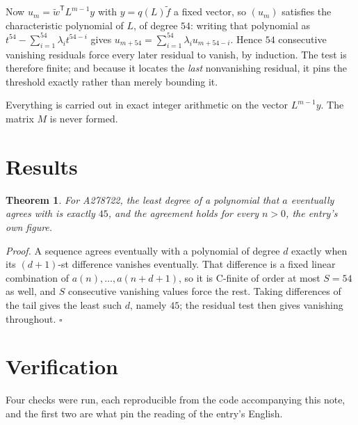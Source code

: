 \documentclass[11pt]{article}
\newtheorem{theorem}{Theorem}
\theoremstyle{definition}
\begin{document}
Now $u_m = \tilde w^{\mathsf T} L^{m-1} y$ with $y = q(L)\tilde f$ a fixed vector, so $(u_m)$ satisfies the characteristic polynomial of $L$, of degree $54$: writing that polynomial as $t^{54} - \sum_{i=1}^{54} \lambda_i t^{54-i}$ gives $u_{m+54} = \sum_{i=1}^{54} \lambda_i u_{m+54-i}$. Hence $54$ consecutive vanishing residuals force every later residual to vanish, by induction. The test is therefore finite; and because it locates the {\itshape last} nonvanishing residual, it pins the threshold exactly rather than merely bounding it.

Everything is carried out in exact integer arithmetic on the vector $L^{m-1}y$. The matrix $M$ is never formed.

\section{Results}

\begin{theorem} For A278722, the least degree of a polynomial that $a$ eventually agrees with is exactly $45$, and the agreement holds for every $n > 0$, the entry's own figure.\end{theorem}

{\itshape Proof.} A sequence agrees eventually with a polynomial of degree $d$ exactly when its $(d+1)$-st difference vanishes eventually. That difference is a fixed linear combination of $a(n),\dots,a(n+d+1)$, so it is C-finite of order at most $S = 54$ as well, and $S$ consecutive vanishing values force the rest. Taking differences of the tail gives the least such $d$, namely $45$; the residual test then gives vanishing throughout. $\square$

\section{Verification}

Four checks were run, each reproducible from the code accompanying this note, and the first two are what pin the reading of the entry's English.
\end{document}
